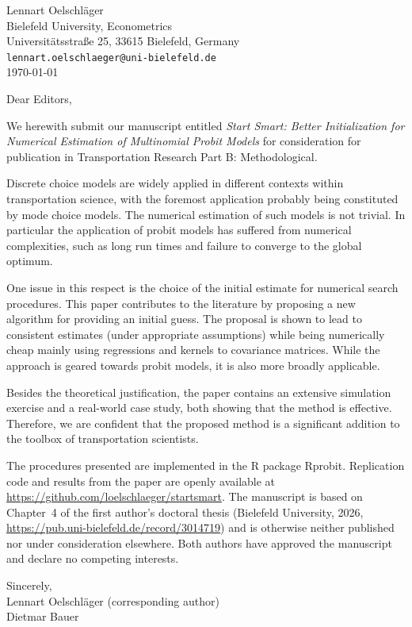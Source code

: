 \documentclass[11pt]{article}
\begin{document}
\begin{flushright}
Lennart Oelschläger\\
Bielefeld University, Econometrics\\
Universitätsstraße 25, 33615 Bielefeld, Germany\\
\texttt{lennart.oelschlaeger@uni-bielefeld.de}\\[0.3em]
\today
\end{flushright}

Dear Editors,

We herewith submit our manuscript entitled \emph{Start Smart: Better Initialization for Numerical Estimation of Multinomial Probit Models} for consideration for publication in Transportation Research Part B: Methodological.

Discrete choice models are widely applied in different
contexts within transportation science, with the
foremost application probably being constituted by mode
choice models. The numerical estimation of such models
is not trivial. In particular the application of probit models has suffered from numerical complexities, such as long run times and failure to converge to the global optimum.

One issue in this respect is the choice of the initial
estimate for numerical search procedures. This paper
contributes to the literature by proposing a new
algorithm for providing an initial guess. The proposal
is shown to lead to consistent estimates (under
appropriate assumptions) while being numerically cheap
mainly using regressions and kernels to covariance
matrices.
While the approach is geared towards probit models, it is also more broadly applicable.

Besides the theoretical justification, the paper contains
an extensive simulation exercise and a real-world case study,
both showing that the method is effective.
Therefore, we are confident that the proposed method is a significant addition to the toolbox of transportation scientists.

The procedures presented are implemented in the R package Rprobit.
Replication code and results from the paper are openly available at
\url{https://github.com/loelschlaeger/startsmart}. The manuscript is based on
Chapter~4 of the first author's doctoral thesis
(Bielefeld University, 2026, \url{https://pub.uni-bielefeld.de/record/3014719})
and is otherwise neither published nor under consideration elsewhere. Both
authors have approved the manuscript and declare no competing interests.

Sincerely,\\[0.3em]
Lennart Oelschläger (corresponding author)\\
Dietmar Bauer
\end{document}
